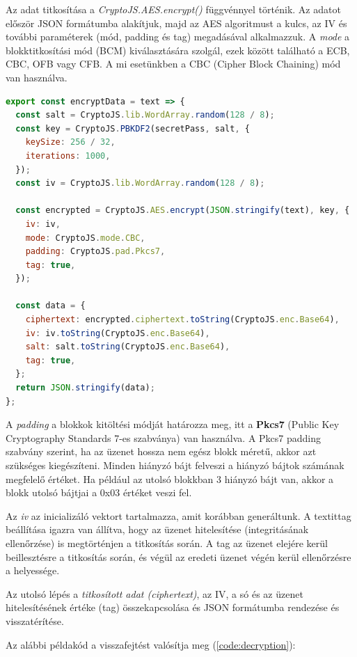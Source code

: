 Az adat titkosítása a \textit{CryptoJS.AES.encrypt()} függvénnyel történik. Az adatot először JSON formátumba alakítjuk, majd az AES algoritmust a kulcs, az IV és további paraméterek (mód, padding és tag) megadásával alkalmazzuk. A \textit{mode} a blokktitkosítási mód (BCM) kiválasztására szolgál, ezek között található a ECB, CBC, OFB vagy CFB. A mi esetünkben a CBC (Cipher Block Chaining) mód van használva.

\begin{lstlisting}[caption={Titkosítás példakód.}, captionpos=b, language = JavaScript, label={code:encryption}]
export const encryptData = text => {
  const salt = CryptoJS.lib.WordArray.random(128 / 8);
  const key = CryptoJS.PBKDF2(secretPass, salt, {
    keySize: 256 / 32,
    iterations: 1000,
  });
  const iv = CryptoJS.lib.WordArray.random(128 / 8);

  const encrypted = CryptoJS.AES.encrypt(JSON.stringify(text), key, {
    iv: iv,
    mode: CryptoJS.mode.CBC,
    padding: CryptoJS.pad.Pkcs7,
    tag: true,
  });

  const data = {
    ciphertext: encrypted.ciphertext.toString(CryptoJS.enc.Base64),
    iv: iv.toString(CryptoJS.enc.Base64),
    salt: salt.toString(CryptoJS.enc.Base64),
    tag: true,
  };
  return JSON.stringify(data);
};
\end{lstlisting}

A \textit{padding} a blokkok kitöltési módját határozza meg, itt a \textbf{Pkcs7} (Public Key Cryptography Standards 7-es szabványa) van használva. A Pkcs7 padding szabvány szerint, ha az üzenet hossza nem egész blokk méretű, akkor azt szükséges kiegészíteni. Minden hiányzó bájt felveszi a hiányzó bájtok számának megfelelő értéket. Ha például az utolsó blokkban 3 hiányzó bájt van, akkor a blokk utolsó bájtjai a 0x03 értéket veszi fel.

Az \textit{iv} az inicializáló vektort tartalmazza, amit korábban generáltunk. A textit{tag} beállítása igazra van állítva, hogy az üzenet hitelesítése (integritásának ellenőrzése) is megtörténjen a titkosítás során. A tag az üzenet elejére kerül beillesztésre a titkosítás során, és végül az eredeti üzenet végén kerül ellenőrzésre a helyessége.

Az utolsó lépés a \textit{titkosított adat (ciphertext)}, az IV, a só és az üzenet hitelesítésének értéke (tag) összekapcsolása és JSON formátumba rendezése és visszatérítése.

Az alábbi példakód a visszafejtést valósítja meg (\ref{code:decryption}):

